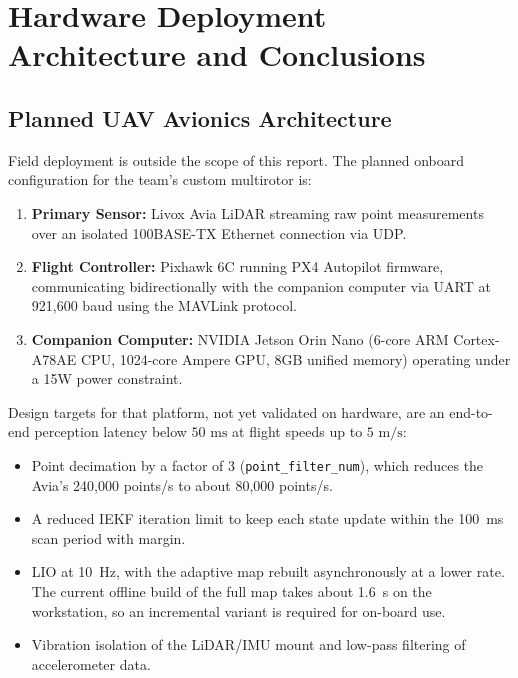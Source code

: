 \documentclass[11pt,a4paper]{report}
\begin{document}
\newpage

\chapter{Hardware Deployment Architecture and Conclusions}

\section{Planned UAV Avionics Architecture}
Field deployment is outside the scope of this report. The planned onboard configuration for the team's custom multirotor is:
\begin{enumerate}
    \item \textbf{Primary Sensor:} Livox Avia LiDAR streaming raw point measurements over an isolated 100BASE-TX Ethernet connection via UDP.
    \item \textbf{Flight Controller:} Pixhawk 6C running PX4 Autopilot firmware, communicating bidirectionally with the companion computer via UART at 921,600 baud using the MAVLink protocol.
    \item \textbf{Companion Computer:} NVIDIA Jetson Orin Nano (6-core ARM Cortex-A78AE CPU, 1024-core Ampere GPU, 8GB unified memory) operating under a 15W power constraint.
\end{enumerate}

Design targets for that platform, not yet validated on hardware, are an end-to-end perception latency below $50\text{ ms}$ at flight speeds up to $5\text{ m/s}$:
\begin{itemize}
    \item Point decimation by a factor of 3 (\texttt{point\_filter\_num}), which reduces the Avia's 240,000 points/s to about 80,000 points/s.
    \item A reduced IEKF iteration limit to keep each state update within the 100~ms scan period with margin.
    \item LIO at 10~Hz, with the adaptive map rebuilt asynchronously at a lower rate. The current offline build of the full map takes about 1.6~s on the workstation, so an incremental variant is required for on-board use.
    \item Vibration isolation of the LiDAR/IMU mount and low-pass filtering of accelerometer data.
\end{itemize}
\end{document}

